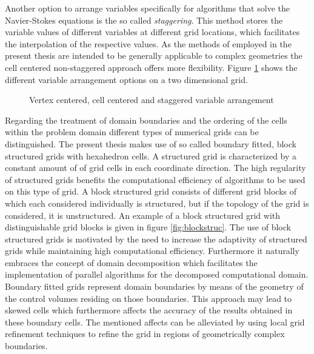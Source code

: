Another option to arrange variables specifically for algorithms that solve the Navier-Stokes equations is the so called \emph{staggering}. This method stores the variable values of different variables at different grid locations, which facilitates the interpolation of the respective values. As the methods of employed in the present thesis are intended to be generally applicable to complex geometries the cell centered non-staggered approach offers more flexibility.  Figure \ref{fig:cellvertex} shows the different variable arrangement options on a two dimensional grid.

\begin{figure}
   \label{fig:cellvertex}
    \hfil
    \hfil
    \caption{Vertex centered, cell centered and staggered variable arrangement}
\end{figure}

Regarding the treatment of domain boundaries and the ordering of the cells within the problem domain different types of numerical grids can be distinguished. The present thesis makes use of so called boundary fitted, block structured grids with hexahedron cells. A structured grid is characterized by a constant amount of of grid cells in each coordinate direction. The high regularity of structured grids benefits the computational efficiency of algorithms to be used on this type of grid. A block structured grid consists of different grid blocks of which each considered individually is structured, but if the topology of the grid is considered, it is unstructured. An example of a block structured grid with distinguishable grid blocks is given in figure \ref{fig:blockstruc}. The use of block structured grids is motivated by the need to increase the adaptivity of structured grids while maintaining high computational efficiency. Furthermore it naturally embraces the concept of domain decomposition which facilitates the implementation of parallel algorithms for the decomposed computational domain. Boundary fitted grids represent domain boundaries by means of the geometry of the control volumes residing on those boundaries. This approach may lead to skewed cells which furthermore affects the accuracy of the results obtained in these boundary cells. The mentioned affects can be alleviated by using local grid refinement techniques to refine the grid in regions of geometrically complex boundaries.

